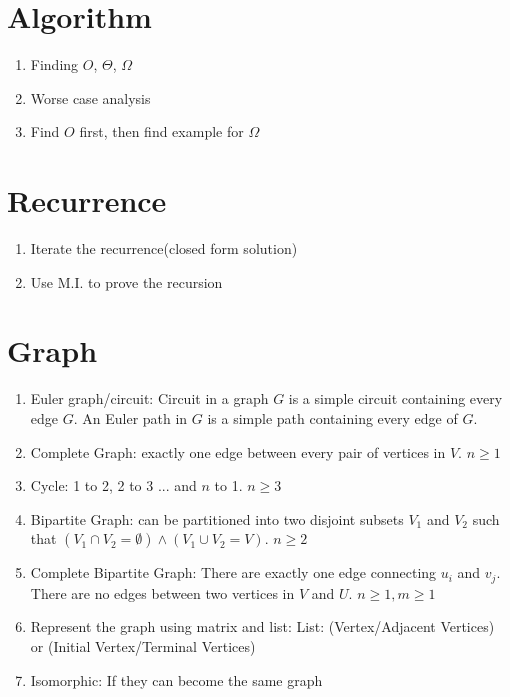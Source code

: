 \documentclass[11pt]{article}
\begin{document}
\section{Algorithm}
\begin{enumerate}
    \item Finding $O$, $\Theta$, $\Omega$
    \item Worse case analysis
    \item Find $O$ first, then find example for $\Omega$
\end{enumerate}


\section{Recurrence}
\begin{enumerate}
    \item Iterate the recurrence(closed form solution)
    \item Use M.I. to prove the recursion
\end{enumerate}


\section{Graph}
\begin{enumerate}
    \item Euler graph/circuit: Circuit in a graph $G$ is a simple circuit containing every edge $G$. An Euler path in $G$ is a simple path containing every edge of $G$.
    \item Complete Graph: exactly one edge between every pair of vertices in $V$. $n\geq 1$
    \item Cycle: 1 to 2, 2 to 3 ... and $n$ to 1. $n \geq 3$
    \item Bipartite Graph: can be partitioned into two disjoint subsets $V_1$ and $V_2$ such that $(V_1\cap V_2 = \emptyset) \land (V_1 \cup V_2 = V)$. $n \geq 2$
    \item Complete Bipartite Graph: There are exactly one edge connecting $u_i$ and $v_j$. There are no edges between two vertices in $V$ and $U$. $n\geq 1, m\geq 1$
    \item Represent the graph using matrix and list: List: (Vertex/Adjacent Vertices) or (Initial Vertex/Terminal Vertices)
    \item Isomorphic: If they can become the same graph
\end{enumerate}

\newpage
\end{document}
